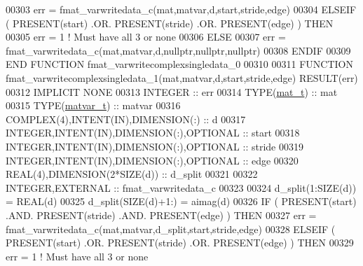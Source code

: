 \begin{DoxyCode}
00303         err = fmat\_varwritedata\_c(mat,matvar,d,start,stride,edge)
00304     \textcolor{keywordflow}{ELSEIF} ( \textcolor{keyword}{PRESENT}(start) .OR. \textcolor{keyword}{PRESENT}(stride) .OR. \textcolor{keyword}{PRESENT}(edge) ) \textcolor{keywordflow}{THEN}
00305         err = 1    \textcolor{comment}{! Must have all 3 or none}
00306     \textcolor{keywordflow}{ELSE}
00307         err = fmat\_varwritedata\_c(mat,matvar,d,nullptr,nullptr,nullptr)
00308 \textcolor{keywordflow}{    ENDIF}
00309 \textcolor{keyword}{END FUNCTION }fmat\_varwritecomplexsingledata\_0
00310 
00311 \textcolor{keyword}{FUNCTION }fmat\_varwritecomplexsingledata\_1(mat,matvar,d,start,stride,edge) \textcolor{keyword}{RESULT}(err)
00312 \textcolor{keywordtype}{IMPLICIT NONE}
00313     \textcolor{keywordtype}{INTEGER}                                  :: err
00314     \textcolor{keywordtype}{TYPE}(\hyperlink{group___m_a_t_gab0fc888f5a5d79943b16284b1f91c2e8}{mat\_t})                              :: mat
00315     \textcolor{keywordtype}{TYPE}(\hyperlink{group___m_a_t_structmatvar__t}{matvar\_t})                           :: matvar
00316     \textcolor{keywordtype}{COMPLEX(4)},\textcolor{keywordtype}{INTENT(IN)},\textcolor{keywordtype}{DIMENSION(:)}   :: d
00317     \textcolor{keywordtype}{INTEGER},\textcolor{keywordtype}{INTENT(IN)},\textcolor{keywordtype}{DIMENSION(:)},\textcolor{keywordtype}{OPTIONAL} :: start
00318     \textcolor{keywordtype}{INTEGER},\textcolor{keywordtype}{INTENT(IN)},\textcolor{keywordtype}{DIMENSION(:)},\textcolor{keywordtype}{OPTIONAL} :: stride
00319     \textcolor{keywordtype}{INTEGER},\textcolor{keywordtype}{INTENT(IN)},\textcolor{keywordtype}{DIMENSION(:)},\textcolor{keywordtype}{OPTIONAL} :: edge
00320     \textcolor{keywordtype}{REAL(4)},\textcolor{keywordtype}{DIMENSION(2*SIZE(d))}    :: d\_split
00321 
00322     \textcolor{keywordtype}{INTEGER},\textcolor{keywordtype}{EXTERNAL}                         :: fmat\_varwritedata\_c
00323 
00324     d\_split(1:\textcolor{keyword}{SIZE}(d))  = \textcolor{keywordtype}{REAL}(d)
00325     d\_split(\textcolor{keyword}{SIZE}(d)+1:) = aimag(d)
00326     \textcolor{keywordflow}{IF} ( \textcolor{keyword}{PRESENT}(start) .AND. \textcolor{keyword}{PRESENT}(stride) .AND. \textcolor{keyword}{PRESENT}(edge) ) \textcolor{keywordflow}{THEN}
00327         err = fmat\_varwritedata\_c(mat,matvar,d\_split,start,stride,edge)
00328     \textcolor{keywordflow}{ELSEIF} ( \textcolor{keyword}{PRESENT}(start) .OR. \textcolor{keyword}{PRESENT}(stride) .OR. \textcolor{keyword}{PRESENT}(edge) ) \textcolor{keywordflow}{THEN}
00329         err = 1    \textcolor{comment}{! Must have all 3 or none}

\end{DoxyCode}
